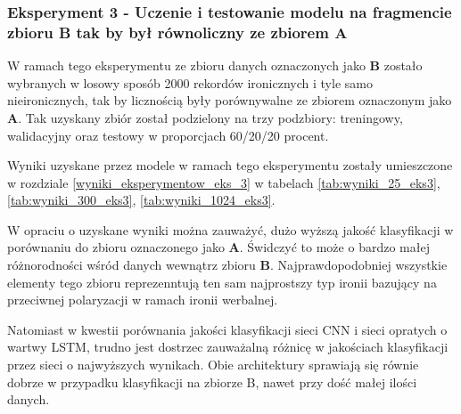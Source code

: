 \subsubsection{Eksperyment 3 - Uczenie i testowanie modelu na fragmencie zbioru B tak by był równoliczny ze zbiorem A}

W ramach tego eksperymentu ze zbioru danych oznaczonych jako \textbf{B} zostało wybranych w losowy sposób 2000 rekordów ironicznych i tyle samo nieironicznych, tak by licznością były porównywalne ze zbiorem oznaczonym jako \textbf{A}. Tak uzyskany zbiór został podzielony na trzy podzbiory: treningowy, walidacyjny oraz testowy w proporcjach 60/20/20 procent.

Wyniki uzyskane przez modele w ramach tego eksperymentu zostały umieszczone w rozdziale \ref{wyniki_eksperymentow_eks_3} w tabelach \ref{tab:wyniki_25_eks3}, \ref{tab:wyniki_300_eks3}, \ref{tab:wyniki_1024_eks3}.



W opraciu o uzyskane wyniki można zauważyć, dużo wyższą jakość klasyfikacji w porównaniu do zbioru oznaczonego jako \textbf{A}. Świdczyć to może o bardzo małej różnorodności wśród danych wewnątrz zbioru \textbf{B}. Najprawdopodobniej wszystkie elementy tego zbioru reprezenntują ten sam najprostszy typ ironii bazujący na przeciwnej polaryzacji w ramach ironii werbalnej.

Natomiast w kwestii porównania jakości klasyfikacji sieci CNN i sieci  opratych o wartwy LSTM, trudno jest dostrzec zauważalną różnicę w jakościach klasyfikacji przez sieci o najwyższych wynikach. Obie architektury sprawiają się równie dobrze w przypadku klasyfikacji na zbiorze B, nawet przy dość małej ilości danych. 





